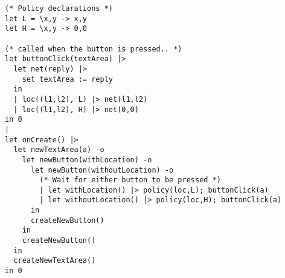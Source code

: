 \begin{figure*}
\begin{verbatim}
(* Policy declarations *)
let L = \x,y -> x,y
let H = \x,y -> 0,0

(* called when the button is pressed.. *)
let buttonClick(textArea) |>
  let net(reply) |>
    set textArea := reply
  in
  | loc((l1,l2), L) |> net(l1,l2)
  | loc((l1,l2), H) |> net(0,0)
in 0
|  
let onCreate() |>
  let newTextArea(a) -o
    let newButton(withLocation) -o
      let newButton(withoutLocation) -o
        (* Wait for either button to be pressed *)
        | let withLocation() |> policy(loc,L); buttonClick(a)
        | let withoutLocation() |> policy(loc,H); buttonClick(a)
      in
      createNewButton()
    in
    createNewButton()
  in
  createNewTextArea()
in 0
\end{verbatim}
\end{figure*}
